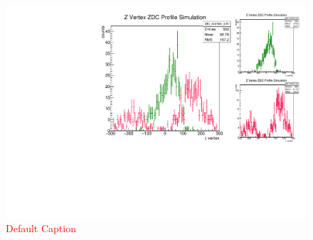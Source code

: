 \begin{figure}
\begin{center}
\includegraphics[width=\linewidth,height=\textheight,keepaspectratio]{./figures/z_profile_scale}
\caption{ \textcolor{red}{Default Caption} }
\label{fig:z_profile_scale}
\end{center}
\end{figure}
